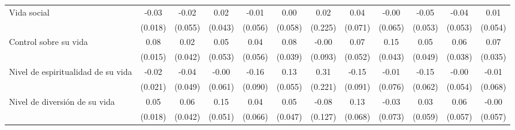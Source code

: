 \documentclass[12pt,spanish]{article}
\begin{document}
\begin{table}[H]
{{\begin{tabular}{l*{11}{c}}
        Vida social     &    -0.03         &    -0.02         &     0.02         &    -0.01         &     0.00         &     0.02         &     0.04         &    -0.00         &    -0.05         &    -0.04         &     0.01         \\
        
        &  (0.018)         &  (0.055)         &  (0.043)         &  (0.056)         &  (0.058)         &  (0.225)         &  (0.071)         &  (0.065)         &  (0.053)         &  (0.053)         &  (0.054)         \\
        [1em]
        
        Control sobre su vida&     0.08\sym{***}&     0.02         &     0.05         &     0.04         &     0.08\sym{*}  &    -0.00         &     0.07         &     0.15\sym{***}&     0.05         &     0.06         &     0.07\sym{*}  \\
        
        &  (0.015)         &  (0.042)         &  (0.053)         &  (0.056)         &  (0.039)         &  (0.093)         &  (0.052)         &  (0.043)         &  (0.049)         &  (0.038)         &  (0.035)         \\
        [1em]
        
        Nivel de espiritualidad de su vida&    -0.02         &    -0.04         &    -0.00         &    -0.16         &     0.13\sym{*}  &     0.31         &    -0.15         &    -0.01         &    -0.15\sym{*}  &    -0.00         &    -0.01         \\
        
        &  (0.021)         &  (0.049)         &  (0.061)         &  (0.090)         &  (0.055)         &  (0.221)         &  (0.091)         &  (0.076)         &  (0.062)         &  (0.054)         &  (0.068)         \\
        [1em]
        
        Nivel de diversión de su vida&     0.05\sym{*}  &     0.06         &     0.15\sym{**} &     0.04         &     0.05         &    -0.08         &     0.13         &    -0.03         &     0.03         &     0.06         &    -0.00         \\
        
        &  (0.018)         &  (0.042)         &  (0.051)         &  (0.066)         &  (0.047)         &  (0.127)         &  (0.068)         &  (0.073)         &  (0.059)         &  (0.057)         &  (0.057)         \\
        [1em]
        

\end{tabular}}}
\end{table}
\end{document}
